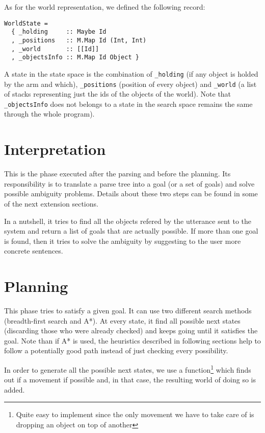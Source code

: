 \documentclass[11pt]{article}
\begin{document}
As for the world representation, we defined the following record:
\begin{verbatim} 
WorldState = 
  { _holding     :: Maybe Id
  , _positions   :: M.Map Id (Int, Int)
  , _world       :: [[Id]]
  , _objectsInfo :: M.Map Id Object } 
\end{verbatim}

A state in the state space is the combination of \texttt{\_holding} (if any object is holded by the arm and which), \texttt{\_positions} (position of every object) and \texttt{\_world} (a list of stacks representing just the ids of the objects of the world). Note that \texttt{\_objectsInfo} does not belongs to a state in the search space 
remains the same through the whole program).
  
  \section{Interpretation}
  This is the phase executed after the parsing and before the planning. Its responsibility is to translate a 
  parse tree into a goal (or a set of goals) and solve possible ambiguity problems. Details about these two steps 
  can be found in some of the next extension sections.

  In a nutshell, it tries to find all the objects refered by the utterance sent to the system and return a list of
  goals that are actually possible. If more than one goal is found, then it tries to solve the ambiguity by 
  suggesting to the user more concrete sentences.


  \section{Planning}
  This phase tries to satisfy a given goal. It can use two different search methods (breadth-first search and A*). At every state, it find all possible next states (discarding those who were already checked) and keeps going 
  until it satisfies the goal. Note than if A* is used, the heuristics described in following sections help to 
  follow a potentially good path instead of just checking every possibility.

  In order to generate all the possible next states, we use a function\footnote{Quite easy to implement 
  since the only movement we have to take care of is dropping an object on top of another} 
  which finds out if a movement if possible and, in that case, the resulting world of doing so is added.
\end{document}
